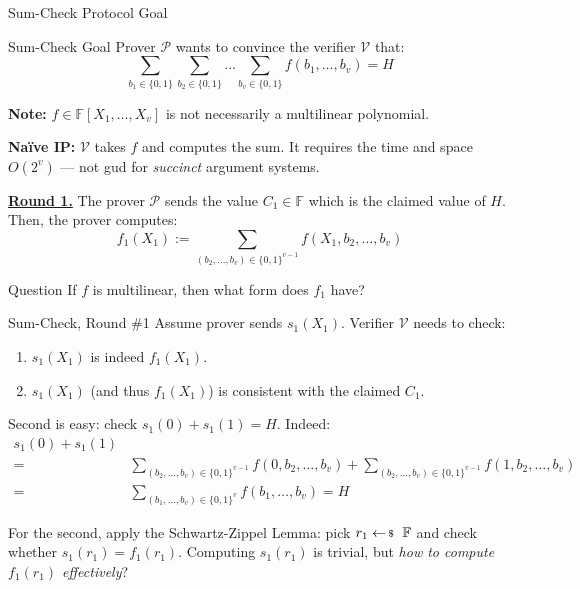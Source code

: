 \documentclass{zkdl-presentation-template}
\begin{document}
    \begin{frame}{Sum-Check Protocol Goal}
        \begin{block}{Sum-Check Goal}
            Prover $\mathcal{P}$ wants to convince the verifier $\mathcal{V}$ that:
            \begin{equation*}
                \sum_{b_1 \in \{0,1\}}\sum_{b_2 \in \{0,1\}}\dots \sum_{b_v \in \{0,1\}} f(b_1,\dots,b_v) = H
            \end{equation*}

            \pause\textbf{Note:} $f \in \mathbb{F}[X_1,\dots,X_v]$ is not necessarily
            a multilinear polynomial.\pause
        \end{block}

        \textbf{Naïve IP:} $\mathcal{V}$ takes $f$ and computes the sum. It
        requires the time and space $O(2^v)$ --- not gud for
        \textit{succinct} argument systems.\pause

        \underline{\textbf{Round 1.}} The prover $\mathcal{P}$ sends the value
        $C_1 \in \mathbb{F}$ which is the claimed value of $H$. \pause Then, the prover computes:
        \begin{equation*}
            f_1(X_1) := \sum_{(b_2,\dots,b_v) \in \{0,1\}^{v-1}}f(X_1,b_2,\dots,b_v)
        \end{equation*}
        
        \vspace{-12.5px}

        \pause
        \begin{questionblock}{Question}
            If $f$ is multilinear, then what form does $f_1$ have?
        \end{questionblock}
    \end{frame}

    \begin{frame}{Sum-Check, Round \#1}
        Assume prover sends $s_1(X_1)$. Verifier $\mathcal{V}$ needs to check:
        \begin{enumerate}
            \item $s_1(X_1)$ is indeed $f_1(X_1)$.
            \item $s_1(X_1)$ (and thus $f_1(X_1)$) is consistent with the
            claimed $C_1$.
        \end{enumerate}

        \pause Second is easy: check $s_1(0) + s_1(1) = H$. Indeed:
        \begin{align*}
            s_1(0) + s_1(1) \\
            =&\sum_{(b_2,\dots,b_v) \in \{0,1\}^{v-1}}f(0,b_2,\dots,b_v) + \sum_{(b_2,\dots,b_v) \in \{0,1\}^{v-1}}f(1,b_2,\dots,b_v) \\
            =&\sum_{(b_1,\dots,b_v) \in \{0,1\}^v} f(b_1,\dots,b_v) = H
        \end{align*}

        \pause For the second, apply the Schwartz-Zippel Lemma: pick $r_1 \leftarrowS
        \mathbb{F}$ and check whether $s_1(r_1) = f_1(r_1)$. Computing
        $s_1(r_1)$ is trivial, but \textit{how to compute $f_1(r_1)$
        effectively}?
    \end{frame}
\end{document}
